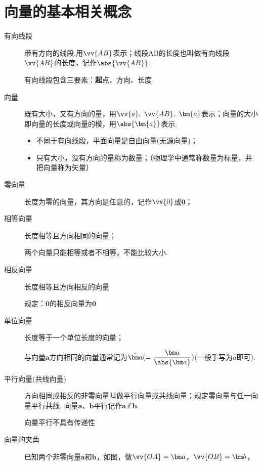   \newtheorem*{Theorem}{定理}
  \makefront
\vspace{-1.5em}
\startexercise
\section{向量的基本相关概念}
  \begin{description}
    \item[有向线段]带有方向的线段.用$\vv{AB}$表示；线段AB的长度也叫做有向线段$\vv{AB}$的长度，记作$\abs{\vv{AB}}$.\par
      {\kaishu 有向线段包含三要素：{\textbf 起点、方向、长度}}
    \item[向量] 既有大小，又有方向的量，用$ \vv{a},~\vv{AB},~\bm{a} $表示；向量的大小即向量的长度或向量的模，用$ \abs{\bm{a}} $表示.\par
      \begin{itemize}[leftmargin=*]
        \kaishu
        \item 不同于有向线段，平面向量是自由向量(无源向量)；
        \item 只有大小，没有方向的量称为数量；（物理学中通常称数量为标量，并把向量称为矢量）
      \end{itemize}
    \item[零向量] 长度为零的向量，其方向是任意的，记作$ \vv{0} $或$ \bm{0} $；
    \item[相等向量] 长度相等且方向相同的向量；\par
      {\kaishu 两个向量只能相等或者不相等，不能比较大小.}
    \item[相反向量] 长度相等且方向相反的向量\par
      {\kaishu 规定：$\bm{0}$的相反向量为$\bm{0}$}
    \item[单位向量] 长度等于一个单位长度的向量；\par
      {\kaishu 与向量$\bm a$方向相同的向量通常记为$\hat{\bm a}(=\dfrac{\bm a}{\abs{\bm a}})$}(一般手写为$\hat a$即可).
    \item[平行向量(共线向量)]方向相同或相反的非零向量叫做平行向量或共线向量；规定零向量与任一向量平行共线.
      向量$\bm{a}$、$\bm{b}$平行记作$\bm{a}\varparallel \bm{b}$.\par
      {\kaishu 向量平行不具有传递性}
    \clearpage
    \item[向量的夹角] 已知两个非零向量$\bm a$和$\bm b$，如图，做$\vv{OA}=\bm a$，$\vv{OB}=\bm b$，

\end{description}
